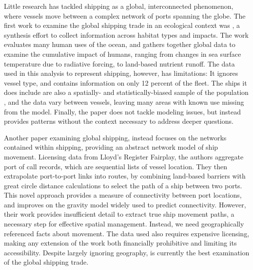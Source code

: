 Little research has tackled shipping as a global, interconnected phenomenon, where vessels move between a complex network of ports spanning the globe. The first work to examine the global shipping trade in an ecological context was \cite{Halpern2008}, a synthesis effort to collect information across habitat types and impacts. The work evaluates many human uses of the ocean, and gathers together global data to examine the cumulative impact of humans, ranging from changes in sea surface temperature due to radiative forcing, to land-based nutrient runoff. The data used in this analysis to represent shipping, however, has limitations: It ignores vessel type, %
 and contains information on only 12 percent of the fleet. The ships it does include are also a spatially- and statistically-biased sample of the population \citep{Wang2007}, and the data vary between vessels, leaving many areas with known use missing from the model. Finally, the paper does not tackle modeling issues, but instead provides patterns without the context necessary to address deeper questions.

Another paper examining global shipping, \cite{Kaluza2010} instead focuses on the networks contained within shipping, providing an abstract network model of ship movement. Licensing data from Lloyd's Register Fairplay, %
 the authors aggregate port of call records, which are sequential lists of vessel location. They then extrapolate port-to-port links into routes, by combining land-based barriers with great circle distance calculations to select the path of a ship between two ports. This novel approach provides a measure of connectivity between port locations, and improves on the gravity model widely used to predict connectivity.  However, their work provides insufficient detail to extract true ship movement paths, a necessary step for effective spatial management. Instead, we need geographically referenced facts about movement. The data used also requires expensive licensing, making any extension of the work both financially prohibitive and limiting its accessibility. Despite largely ignoring geography, \cite{Kaluza2010} is currently the best examination of the global shipping trade.

